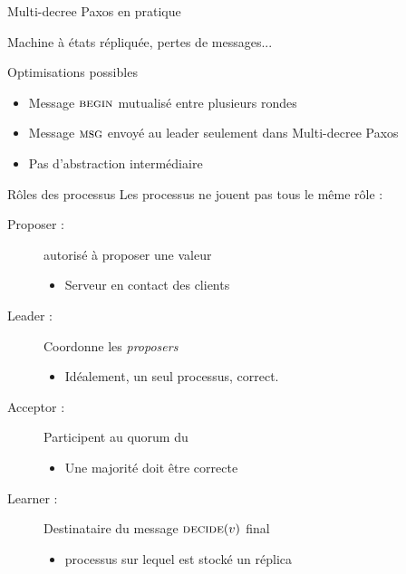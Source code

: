 
\begingroup

\begin{frame}{Multi-decree Paxos en pratique}

  Machine à états répliquée, pertes de messages...

  \begin{block}{Optimisations possibles}
    \begin{itemize}
    \item Message $\textsc{begin}$ mutualisé entre plusieurs rondes
    \item Message $\textsc{msg}$ envoyé au leader seulement dans Multi-decree Paxos
    \item Pas d'abstraction intermédiaire
    \end{itemize}
  \end{block}

  \begin{block}{Rôles des processus}
    Les processus ne jouent pas tous le même rôle :
    \begin{description}
    \item[Proposer :] autorisé à proposer une valeur
      \begin{itemize}
      \item \vspace{-1mm} Serveur en contact des clients
      \end{itemize}
    \item[Leader :] Coordonne les \emph{proposers}
      \begin{itemize}
      \item \vspace{-1mm} Idéalement, un seul processus, correct. 
      \end{itemize}
    \item[Acceptor :] Participent au quorum du 
      \begin{itemize}
      \item \vspace{-1mm} Une majorité doit être correcte
      \end{itemize}
    \item[Learner :] Destinataire du message $\textsc{decide}(v)$ final
      \begin{itemize}
      \item \vspace{-1mm} processus sur lequel est stocké un réplica
      \end{itemize}
    \end{description}
  \end{block}

\end{frame}

\endgroup
\endinput
